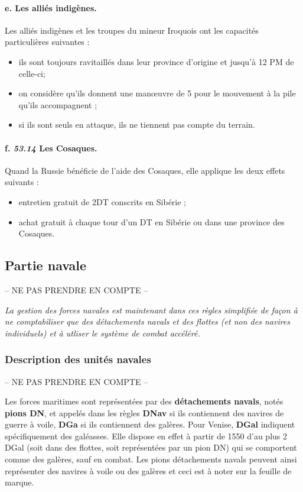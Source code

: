 \paragraph{e. Les alliés indigènes.}\label{chMilitary:Movement:Indian forces}
Les alliés indigènes et les troupes du mineur Iroquois ont les capacités particulières
suivantes :
\begin{itemize}
\item ils sont toujours ravitaillés dans leur province d'origine et jusqu'à 12 PM de 
celle-ci;
\item on considère qu'ils donnent une man{\oe}uvre de 5 pour le mouvement à la pile
qu'ils accompagnent ;
\item si ils sont seuls en attaque, ils ne tiennent pas compte du terrain.
\end{itemize}

\paragraph{f. \textit{53.14} Les Cosaques.}
Quand la Russie bénéficie de l'aide des Cosaques, elle applique les deux
effets suivants :
\begin{itemize}
\item entretien gratuit de 2DT conscrits en Sibérie ;
\item achat gratuit à chaque tour d'un DT en Sibérie ou dans une province des Cosaques.
\end{itemize}


\subsection{Partie navale}
-- NE PAS PRENDRE EN COMPTE --


\emph{La gestion des forces navales est maintenant dans ces règles simplifiée
de façon à ne comptabiliser que des détachements navals
et des flottes (et non des navires individuels) et à utliser le système
de combat accéléré.}


\subsubsection{Description des unités navales}
-- NE PAS PRENDRE EN COMPTE --

Les forces maritimes sont représentées par des \textbf{détachements navals},
notés \textbf{pions DN}, et appelés dans les règles
\textbf{DNav} si ils contiennent des navires de guerre à voile, 
{\bf DGa} si ils
contiennent des galères. Pour Venise, {\bf DGal} indiquent spécifiquement des
galéasses. Elle dispose en effet à partir de 1550 d'au plus 
2 DGal (soit dans des flottes, soit
représentées par un pion DN) qui se comportent comme des galères, sauf
en combat.
Les pions détachements navals peuvent ainsi représenter des navires
à voile ou des galères et ceci est à noter sur la feuille de marque. 
\medskip 

